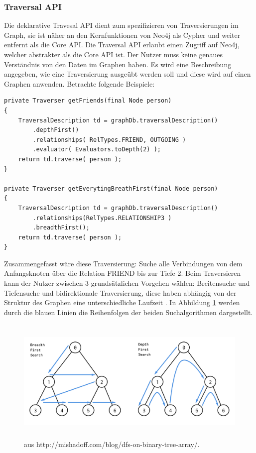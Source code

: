 \subsubsection{Traversal API}
Die deklarative Travesal API dient zum spezifizieren von Traversierungen im Graph, sie ist näher an den Kernfunktionen von Neo4j als Cypher und weiter entfernt als die Core API. Die Traversal API erlaubt einen Zugriff auf Neo4j, welcher  abstrakter als die Core API ist. Der Nutzer muss keine genaues Verständnis von den Daten im Graphen haben. Es wird eine Beschreibung angegeben, wie eine Traversierung  ausgeübt werden soll und diese wird auf einen Graphen anwenden. Betrachte folgende Beispiele:
\begin{Verbatim}[frame=single]
private Traverser getFriends(final Node person)
{
	TraversalDescription td = graphDb.traversalDescription()
		.depthFirst()
		.relationships( RelTypes.FRIEND, OUTGOING )
		.evaluator( Evaluators.toDepth(2) );
	return td.traverse( person );
}

private Traverser getEverytingBreathFirst(final Node person)
{
	TraversalDescription td = graphDb.traversalDescription()
		.relationships(RelTypes.RELATIONSHIP3 )
		.breadthFirst();
	return td.traverse( person );
}
\end{Verbatim}
Zusammengefasst wäre diese Traversierung: Suche alle Verbindungen von dem Anfangsknoten über die Relation FRIEND bis zur Tiefe 2.  Beim Traversieren kann der  Nutzer zwischen 3 grundsätzlichen Vorgehen wählen: Breitensuche und Tiefensuche und bidirektionale Traversierung, diese haben abhängig von der Struktur des Graphen eine unterschiedliche Laufzeit \parencite{vukotic2015neo4j}. In  Abbildung \ref{fig:Search} werden durch die blauen Linien die Reihenfolgen der beiden Suchalgorithmen dargestellt.
\begin{figure}[!htb]
	\centering
	\includegraphics [width=14cm, height=6cm]{Figures/search}
	\caption[Search]{ aus http://mishadoff.com/blog/dfs-on-binary-tree-array/.}
	\label{fig:Search}
\end{figure} \newline

